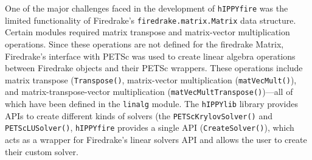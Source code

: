 \begin{itemize}
    One of the major challenges faced in the development of \texttt{hIPPYfire} was the limited functionality of Firedrake's \texttt{firedrake.matrix.Matrix} data structure. Certain modules required matrix transpose and matrix-vector multiplication operations. Since these operations are not defined for the firedrake Matrix, Firedrake's interface with PETSc was used to create linear algebra operations between Firedrake objects and their PETSc wrappers. These operations include matrix transpose (\texttt{Transpose()}, matrix-vector multiplication (\texttt{matVecMult()}), and matrix-transpose-vector multiplication (\texttt{matVecMultTranspose()})---all of which have been defined in the \texttt{linalg} module. 
    The \texttt{hIPPYlib} library provides APIs to create different kinds of solvers (the \texttt{PETScKrylovSolver()} and \texttt{PETScLUSolver()}, \texttt{hIPPYfire} provides a single API (\texttt{CreateSolver()}), which acts as a wrapper for Firedrake's linear solvers API and allows the user to create their custom solver.
\end{itemize}